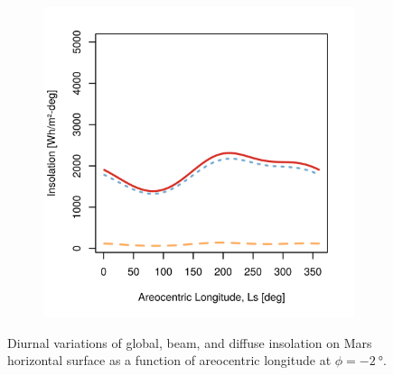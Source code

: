 \begin{figure}[h]
\begin{subfigure}[t]{\subfigureWidth}
  		\label{fig:sub:insolation-ls-tau-factor-2}
  	\end{subfigure}\hfill
	   \begin{subfigure}[t]{\subfigureWidth}
      \centering
  		\includegraphics[height=\graphicsHeight]{sections/mars-solar-energy/solar-radiation/plots/hh-hbh-and-hdh-as-a-function-of-ls-for-tau3-phi2-and-albedo-027}
  		\label{fig:sub:insolation-ls-tau-factor-3}
	   \end{subfigure}\hfill
	\caption[Dirunal insolation variations on Mars horizontal surface]
    {Diurnal variations of global, beam, and diffuse insolation on Mars horizontal surface as a function of areocentric longitude at $\phi = \SI{-2}{\degree}$.}
	\label{fig:plot:insolation-ls}
\vspace{-2ex}
\end{figure}

